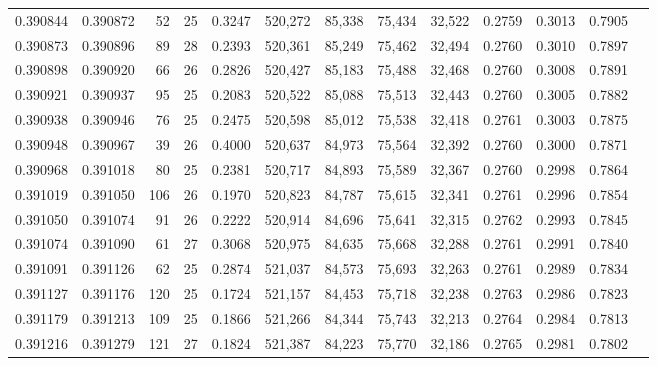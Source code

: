 \begin{tabular}{rrrrrrrrrrrrr}
0.390844 & 0.390872 &    52 &  25 &                                     0.3247 & 520,272 &  85,338 &  75,434 &  32,522 & 0.2759 & 0.3013 & 0.7905 \\
0.390873 & 0.390896 &    89 &  28 &                                     0.2393 & 520,361 &  85,249 &  75,462 &  32,494 & 0.2760 & 0.3010 & 0.7897 \\
0.390898 & 0.390920 &    66 &  26 &                                     0.2826 & 520,427 &  85,183 &  75,488 &  32,468 & 0.2760 & 0.3008 & 0.7891 \\
0.390921 & 0.390937 &    95 &  25 &                                     0.2083 & 520,522 &  85,088 &  75,513 &  32,443 & 0.2760 & 0.3005 & 0.7882 \\
0.390938 & 0.390946 &    76 &  25 &                                     0.2475 & 520,598 &  85,012 &  75,538 &  32,418 & 0.2761 & 0.3003 & 0.7875 \\
0.390948 & 0.390967 &    39 &  26 &                                     0.4000 & 520,637 &  84,973 &  75,564 &  32,392 & 0.2760 & 0.3000 & 0.7871 \\
0.390968 & 0.391018 &    80 &  25 &                                     0.2381 & 520,717 &  84,893 &  75,589 &  32,367 & 0.2760 & 0.2998 & 0.7864 \\
0.391019 & 0.391050 &   106 &  26 &                                     0.1970 & 520,823 &  84,787 &  75,615 &  32,341 & 0.2761 & 0.2996 & 0.7854 \\
0.391050 & 0.391074 &    91 &  26 &                                     0.2222 & 520,914 &  84,696 &  75,641 &  32,315 & 0.2762 & 0.2993 & 0.7845 \\
0.391074 & 0.391090 &    61 &  27 &                                     0.3068 & 520,975 &  84,635 &  75,668 &  32,288 & 0.2761 & 0.2991 & 0.7840 \\
0.391091 & 0.391126 &    62 &  25 &                                     0.2874 & 521,037 &  84,573 &  75,693 &  32,263 & 0.2761 & 0.2989 & 0.7834 \\
0.391127 & 0.391176 &   120 &  25 &                                     0.1724 & 521,157 &  84,453 &  75,718 &  32,238 & 0.2763 & 0.2986 & 0.7823 \\
0.391179 & 0.391213 &   109 &  25 &                                     0.1866 & 521,266 &  84,344 &  75,743 &  32,213 & 0.2764 & 0.2984 & 0.7813 \\
0.391216 & 0.391279 &   121 &  27 &                                     0.1824 & 521,387 &  84,223 &  75,770 &  32,186 & 0.2765 & 0.2981 & 0.7802 \\

\end{tabular}
